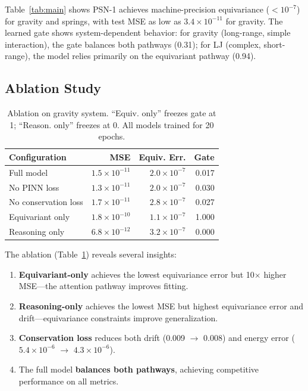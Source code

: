 \documentclass[10pt,twocolumn]{article}
\begin{document}
Table~\ref{tab:main} shows PSN-1 achieves machine-precision equivariance ($< 10^{-7}$) for gravity and springs, with test MSE as low as $3.4 \times 10^{-11}$ for gravity. The learned gate shows system-dependent behavior: for gravity (long-range, simple interaction), the gate balances both pathways (0.31); for LJ (complex, short-range), the model relies primarily on the equivariant pathway (0.94).

\subsection{Ablation Study}

\begin{table}[t]
\centering
\caption{Ablation on gravity system. ``Equiv. only'' freezes gate at 1; ``Reason. only'' freezes at 0. All models trained for 20 epochs.}
\label{tab:ablation}
\begin{tabular}{lrrr}
\toprule
Configuration & MSE & Equiv. Err. & Gate \\
\midrule
Full model & $1.5 \times 10^{-11}$ & $2.0 \times 10^{-7}$ & 0.017 \\
No PINN loss & $1.3 \times 10^{-11}$ & $2.0 \times 10^{-7}$ & 0.030 \\
No conservation loss & $1.7 \times 10^{-11}$ & $2.8 \times 10^{-7}$ & 0.027 \\
Equivariant only & $1.8 \times 10^{-10}$ & $1.1 \times 10^{-7}$ & 1.000 \\
Reasoning only & $6.8 \times 10^{-12}$ & $3.2 \times 10^{-7}$ & 0.000 \\
\bottomrule
\end{tabular}
\end{table}

The ablation (Table~\ref{tab:ablation}) reveals several insights:
\begin{enumerate}
    \item \textbf{Equivariant-only} achieves the lowest equivariance error but 10$\times$ higher MSE---the attention pathway improves fitting.
    \item \textbf{Reasoning-only} achieves the lowest MSE but highest equivariance error and drift---equivariance constraints improve generalization.
    \item \textbf{Conservation loss} reduces both drift (0.009 $\to$ 0.008) and energy error ($5.4 \times 10^{-6}$ $\to$ $4.3 \times 10^{-6}$).
    \item The full model \textbf{balances both pathways}, achieving competitive performance on all metrics.
\end{enumerate}
\end{document}
